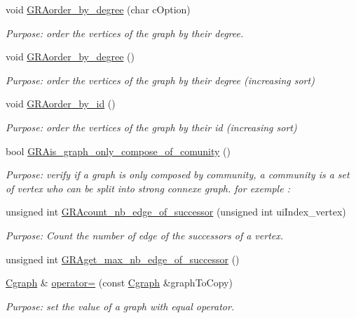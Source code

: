 \begin{DoxyCompactItemize}
void \hyperlink{class_cgraph_ab25a1c2907cf1329916ecaa4a793016e}{G\+R\+Aorder\+\_\+by\+\_\+degree} (char c\+Option)
\begin{DoxyCompactList}\small\item\em Purpose\+: order the vertices of the graph by their degree. \end{DoxyCompactList}\item 
void \hyperlink{class_cgraph_a5df435955743266a7b9d9f7fa8158184}{G\+R\+Aorder\+\_\+by\+\_\+degree} ()
\begin{DoxyCompactList}\small\item\em Purpose\+: order the vertices of the graph by their degree (increasing sort) \end{DoxyCompactList}\item 
void \hyperlink{class_cgraph_a8d76681a65dead8a7b9f04ee07b64a81}{G\+R\+Aorder\+\_\+by\+\_\+id} ()
\begin{DoxyCompactList}\small\item\em Purpose\+: order the vertices of the graph by their id (increasing sort) \end{DoxyCompactList}\item 
bool \hyperlink{class_cgraph_a145aba32956baffe1ffd764d66eb3666}{G\+R\+Ais\+\_\+graph\+\_\+only\+\_\+compose\+\_\+of\+\_\+comunity} ()
\begin{DoxyCompactList}\small\item\em Purpose\+: verify if a graph is only composed by community, a community is a set of vertex who can be split into strong connexe graph. for exemple \+: \end{DoxyCompactList}\item 
unsigned int \hyperlink{class_cgraph_aecad66530e50f2bd52cf8bf1fc7fdc05}{G\+R\+Acount\+\_\+nb\+\_\+edge\+\_\+of\+\_\+successor} (unsigned int ui\+Index\+\_\+vertex)
\begin{DoxyCompactList}\small\item\em Purpose\+: Count the number of edge of the successors of a vertex. \end{DoxyCompactList}\item 
unsigned int \hyperlink{class_cgraph_a5f237cd690b3ae91a44d09faff9b4090}{G\+R\+Aget\+\_\+max\+\_\+nb\+\_\+edge\+\_\+of\+\_\+successor} ()
\item 
\hyperlink{class_cgraph}{Cgraph} \& \hyperlink{class_cgraph_a324c43b3a1df7ae07d2b135550544527}{operator=} (const \hyperlink{class_cgraph}{Cgraph} \&graph\+To\+Copy)
\begin{DoxyCompactList}\small\item\em Purpose\+: set the value of a graph with equal operator. \end{DoxyCompactList}\item 

\end{DoxyCompactItemize}
